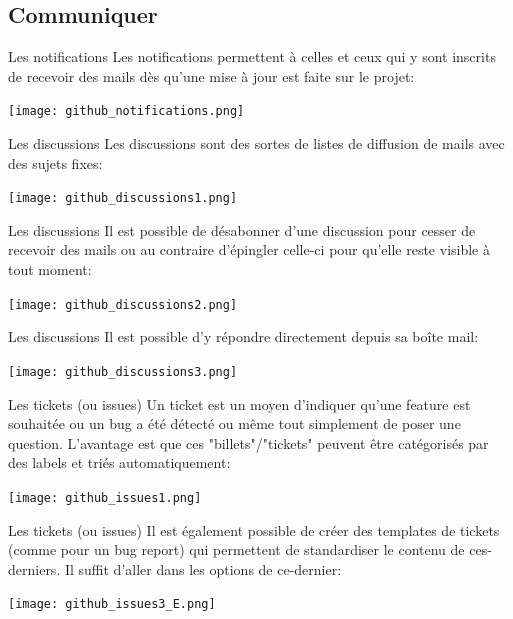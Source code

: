 \documentclass{beamer}
\begin{document}
\subsection{Communiquer}
\begin{frame}{Les notifications}
Les notifications permettent à celles et ceux qui y sont inscrits de recevoir des mails dès qu'une mise à jour est faite sur le projet:
\begin{center}
	\texttt{[image: github\_notifications.png]}
\end{center}
\end{frame}

\begin{frame}{Les discussions}
Les discussions sont des sortes de listes de diffusion de mails avec des sujets fixes:
\begin{center}
	\texttt{[image: github\_discussions1.png]}
\end{center}
\end{frame}

\begin{frame}{Les discussions}
Il est possible de désabonner d'une discussion pour cesser de recevoir des mails ou au contraire d'épingler celle-ci pour qu'elle reste visible à tout moment:
\begin{center}
	\texttt{[image: github\_discussions2.png]}
\end{center}
\end{frame}

\begin{frame}{Les discussions}
Il est possible d'y répondre directement depuis sa boîte mail:
\begin{center}
	\texttt{[image: github\_discussions3.png]}
\end{center}
\end{frame}

\begin{frame}{Les tickets (ou issues)}
Un ticket est un moyen d'indiquer qu'une feature est souhaitée ou un bug a été détecté ou même tout simplement de poser une question. L'avantage est que ces "billets"/"tickets" peuvent être catégorisés par des labels et triés automatiquement:
\begin{center}
	\texttt{[image: github\_issues1.png]}
\end{center}
\end{frame}

\begin{frame}{Les tickets (ou issues)}
Il est également possible de créer des templates de tickets (comme pour un bug report) qui permettent de standardiser le contenu de ces-derniers. Il suffit d'aller dans les options de ce-dernier:
\begin{center}
	\texttt{[image: github\_issues3\_E.png]}
\end{center}
\end{frame}
\end{document}
